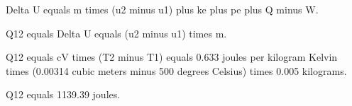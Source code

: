 Delta U equals m times (u2 minus u1) plus ke plus pe plus Q minus W.  

Q12 equals Delta U equals (u2 minus u1) times m.  

Q12 equals cV times (T2 minus T1) equals 0.633 joules per kilogram Kelvin times (0.00314 cubic meters minus 500 degrees Celsius) times 0.005 kilograms.  

Q12 equals 1139.39 joules.